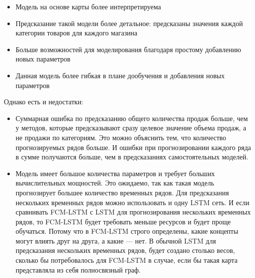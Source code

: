 \begin{itemize}
	\item Модель на основе карты более интерпретируема
	\item Предсказание такой модели более детальное: предсказаны значения каждой категории товаров для каждого магазина
	\item Больше возможностей для моделирования благодаря простому добавлению новых параметров
	\item Данная модель более гибкая в плане дообучения и добавления новых параметров
\end{itemize}

Однако есть и недостатки:
\begin{itemize}
	\item Суммарная ошибка по предсказанию общего количества продаж больше,
	чем у методов, которые предсказывают сразу целевое значение объема продаж,
	а не продажи по категориям. Это можно объяснить тем, что количество прогнозируемых рядов больше.
	И ошибки при прогнозировании каждого ряда в сумме получаются больше, чем в предсказаниях
	самостоятельных моделей.
	\item Модель имеет большое количества параметров и требует больших вычислительных мощностей.
	Это ожидаемо, так как такая модель прогнозирует большее количество временных рядов.
	Для предсказания нескольких временных рядов можно использовать и одну LSTM
	сеть. И если сравнивать FCM-LSTM с LSTM для прогнозирования нескольких временных рядов,
	то FCM-LSTM будет требовать меньше ресурсов и будет проще обучаться. Потому что
	в FCM-LSTM строго определены, какие концепты могут влиять друг на друга, а какие --- нет.
	В обычной LSTM для предсказания нескольких временных рядов, будет создано столько весов,
	сколько бы потребовалось для FCM-LSTM в случае, если бы такая карта представляла из себя
	полносвязный граф.
\end{itemize}



